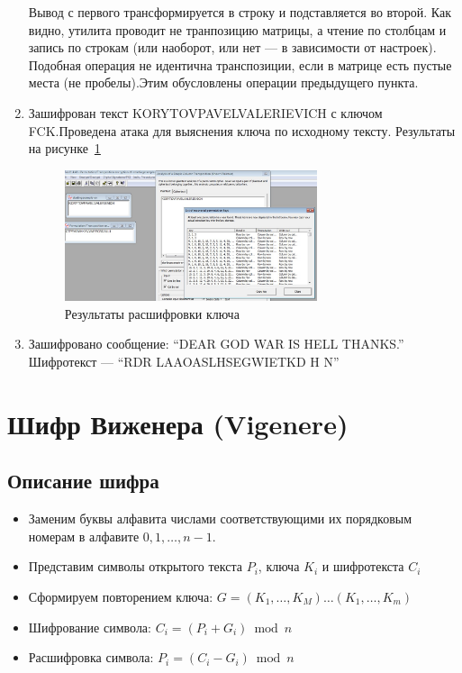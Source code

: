 \documentclass[a4paper, 14pt]{extarticle}
\begin{document}
\begin{enumerate}
    Вывод с первого трансформируется в строку и подставляется во второй. Как видно, утилита проводит не транпозицию матрицы, а чтение по столбцам и запись по строкам (или наоборот, или нет --- в зависимости от настроек).\\ 
    Подобная операция не идентична транспозиции, если в матрице есть пустые места (не пробелы).Этим обусловлены операции предыдущего пункта.\\

    \item Зашифрован текст KORYTOVPAVELVALERIEVICH с ключом FCK.\@ Проведена атака для выяснения ключа по исходному тексту. Результаты на рисунке~\ref{img:2:3}
    \begin{figure}[h]
        \centering
        \includegraphics[width=0.7\textwidth]{./img/S009.jpg}
        \caption{Результаты расшифровки ключа}%
        \label{img:2:3}
    \end{figure}
    
    \item Зашифровано сообщение: ``DEAR GOD WAR IS HELL THANKS.''\\
    Шифротекст --- ``RDR LAAOASLHSEGWIETKD H N''
    
\end{enumerate}

\FloatBarrier{}
\section{Шифр Виженера (Vigenere)}
\subsection{Описание шифра}
\begin{itemize}
    \item Заменим буквы алфавита числами соответствующими их порядковым номерам в алфавите $0, 1, \ldots, n-1$.
    \item Представим символы открытого текста $P_i$, ключа $K_i$ и шифротекста $C_i$
    \item Сформируем  повторением ключа: $G=(K_1, \ldots, K_M) \ldots (K_1, \ldots, K_m)$
    \item Шифрование символа: $C_i = (P_i + G_i) \bmod n$
    \item Расшифровка символа: $P_i = (C_i - G_i) \bmod n$
\end{itemize}
\end{document}
